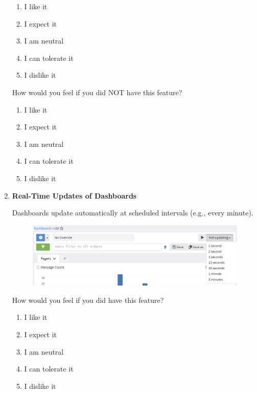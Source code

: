 \documentclass[../main.tex]{subfiles}
\begin{document}
\begin{enumerate}
    \begin{enumerate}
        \item I like it
        \item I expect it
        \item  I am neutral
        \item I can tolerate it
        \item I dislike it
    \end{enumerate}

    How would you feel if you did NOT have this feature?
    
    \begin{enumerate}
        \item I like it
        \item I expect it
        \item  I am neutral
        \item I can tolerate it
        \item I dislike it
    \end{enumerate}

    \clearpage
    \item \textbf{Real-Time Updates of Dashboards}
    
    Dashboards update automatically at scheduled intervals (e.g., every minute).

    \begin{figure}[H]
        \centering
        \includegraphics[scale=0.6]{img/10-appendix/dashboard_update.png}
        \label{fig:dashboard_update}
    \end{figure}

    How would you feel if you did have this feature?
    
    \begin{enumerate}
        \item I like it
        \item I expect it
        \item  I am neutral
        \item I can tolerate it
        \item I dislike it
    \end{enumerate}


\end{enumerate}
\end{document}
